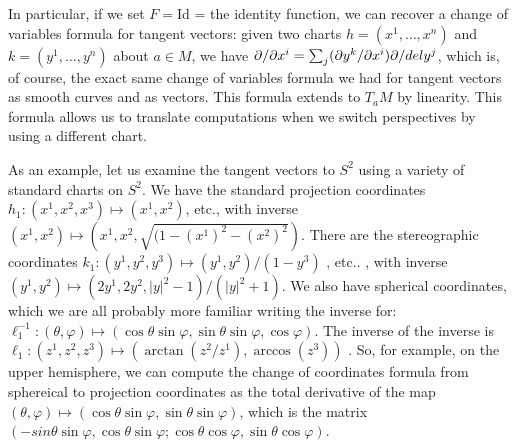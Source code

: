 In particular, if we set $F=$Id = the identity function, we can recover a change of
variables formula for tangent vectors: given two charts $h=(x^1,\ldots ,x^n)$ and
$k=(y^1,\ldots ,y^n)$ about $a\in M$, we have 
$\partial/\partial x^i = \sum_j(\partial y^k/\partial x^i)\partial/del y^j$, which is, of course, the
exact same change of variables formula we had for tangent vectors as smooth
curves and as vectors. This formula extends to $T_aM$ by linearity. This formula
allows us to translate computations when we switch perspectives by using a 
different chart.

\ssk

As an example, let us examine the tangent vectors to $S^2$ using a variety of
standard charts on $S^2$. We have the standard projection coordinates 
$h_1:(x^1,x^2,x^3)\mapsto (x^1,x^2)$, etc., 
with inverse $(x^1,x^2)\mapsto (x^1,x^2,\sqrt{(1-(x^1)^2-(x^2)^2})$.
There are the stereographic coordinates
$k_1:(y^1,y^2,y^3)\mapsto (y^1,y^2)/(1-y^3)$ , etc.. ,
with inverse $(y^1,y^2)\mapsto (2y^1,2y^2,|y|^2-1)/(|y|^2+1)$.
We also have spherical coordinates, 
which we are all probably more familiar writing the inverse for:
$\ell_1^{-1}:(\theta,\varphi)\mapsto (\cos\theta \sin\varphi, \sin\theta \sin\varphi,\cos\varphi)$.
The inverse of the inverse is 
$\ell_1:(z^1,z^2,z^3)\mapsto(\arctan(z^2/z^1),\arccos(z^3))$ .
So, for example, on the upper hemisphere, we can compute the change of coordinates
formula from sphereical to projection coordinates as the total derivative 
of the map $(\theta,\varphi)\mapsto (\cos\theta \sin\varphi,\sin\theta \sin\varphi)$,
which is the matrix $(-sin\theta \sin\varphi,\cos\theta \sin\varphi;\cos\theta \cos\varphi,\sin\theta \cos\varphi)$.

\msk

